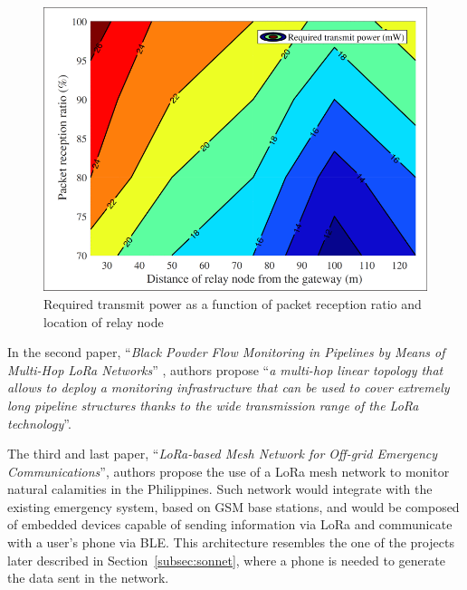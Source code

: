 				\begin{figure}[h]
					\centering
					\includegraphics[width=.75\textwidth]{resources/img/chap4/transmit}
					\caption[Required transmit power as a function of packet reception ratio and location of relay node]{Required transmit power as a function of packet reception ratio and location of relay node \cite{8884231}}
					\label{img:transmit}
				\end{figure}
			
				In the second paper, ``\textit{Black Powder Flow Monitoring in Pipelines by Means of Multi-Hop LoRa Networks}'' \cite{8792890}, authors propose ``\textit{a multi-hop linear topology that allows to deploy a monitoring infrastructure that can be used to cover extremely long pipeline structures thanks to the wide transmission range of the LoRa technology}''.
				
				The third and last paper, ``\textit{LoRa-based Mesh Network for Off-grid Emergency Communications}'', authors propose the use of a LoRa mesh network to monitor natural calamities in the Philippines.
				Such network would integrate with the existing emergency system, based on GSM base stations, and would be composed of embedded devices capable of sending information via LoRa and communicate with a user's phone via BLE.
				This architecture resembles the one of the projects later described in Section~\ref{subsec:sonnet}, where a phone is needed to generate the data sent in the network.
				

